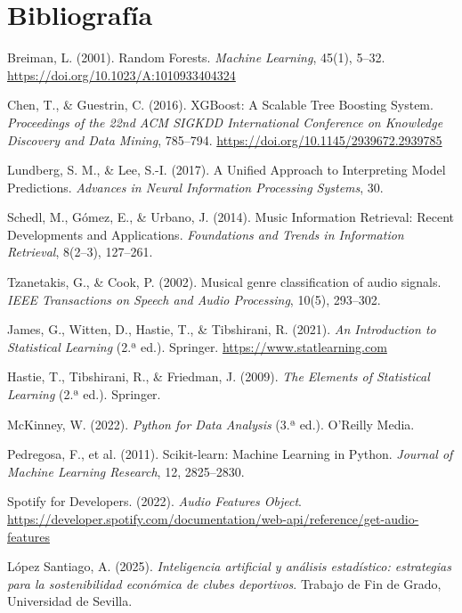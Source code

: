 \documentclass[12pt, a4paper, twoside]{book}
\theoremstyle{definition}
\begin{document}
\chapter*{Bibliografía}

\begin{enumerate}[label={[\arabic*]}]

  \item Breiman, L. (2001). Random Forests. \textit{Machine Learning}, 45(1), 5--32.
        \url{https://doi.org/10.1023/A:1010933404324}

  \item Chen, T., \& Guestrin, C. (2016). XGBoost: A Scalable Tree Boosting System.
        \textit{Proceedings of the 22nd ACM SIGKDD International Conference on
        Knowledge Discovery and Data Mining}, 785--794.
        \url{https://doi.org/10.1145/2939672.2939785}

  \item Lundberg, S. M., \& Lee, S.-I. (2017). A Unified Approach to Interpreting
        Model Predictions. \textit{Advances in Neural Information Processing Systems},
        30.

  \item Schedl, M., Gómez, E., \& Urbano, J. (2014). Music Information Retrieval:
        Recent Developments and Applications. \textit{Foundations and Trends in
        Information Retrieval}, 8(2--3), 127--261.

  \item Tzanetakis, G., \& Cook, P. (2002). Musical genre classification of audio
        signals. \textit{IEEE Transactions on Speech and Audio Processing},
        10(5), 293--302.

  \item James, G., Witten, D., Hastie, T., \& Tibshirani, R. (2021).
        \textit{An Introduction to Statistical Learning} (2.ª ed.). Springer.
        \url{https://www.statlearning.com}

  \item Hastie, T., Tibshirani, R., \& Friedman, J. (2009).
        \textit{The Elements of Statistical Learning} (2.ª ed.). Springer.

  \item McKinney, W. (2022). \textit{Python for Data Analysis} (3.ª ed.).
        O'Reilly Media.

  \item Pedregosa, F., et al. (2011). Scikit-learn: Machine Learning in Python.
        \textit{Journal of Machine Learning Research}, 12, 2825--2830.

  \item Spotify for Developers. (2022). \textit{Audio Features Object}.
        \url{https://developer.spotify.com/documentation/web-api/reference/get-audio-features}

  \item López Santiago, A. (2025). \textit{Inteligencia artificial y análisis
        estadístico: estrategias para la sostenibilidad económica de clubes
        deportivos}. Trabajo de Fin de Grado, Universidad de Sevilla.

\end{enumerate}
\end{document}
